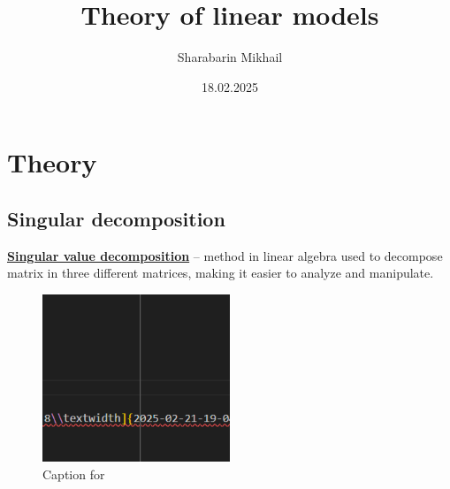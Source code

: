\documentclass{article}
\title{Theory of linear models}
\author{Sharabarin Mikhail}
\date{18.02.2025}
\begin{document}
\section{Theory}
\subsection{Singular decomposition}
\href{https://www.geeksforgeeks.org/singular-value-decomposition-svd/}{\textbf{Singular value decomposition}} -- method in linear algebra used to decompose
    matrix in three different matrices, making it easier to analyze and manipulate.


\begin{figure}[h]     \centering     \includegraphics[width=0.5\textwidth]{2025-02-21-19-05-35.png}     \caption{Caption for }     \label{} \end{figure}
\end{document}
